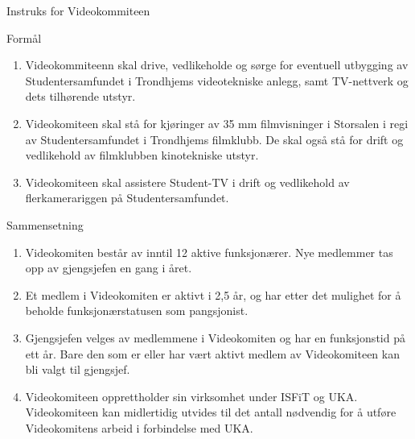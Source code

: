 
\begin{instruks}{Instruks for Videokommiteen}{ }{ }
    
    \begin{instruksledd}{Formål}
        \begin{enumerate}
            \item Videokommiteenn skal drive, vedlikeholde og sørge for eventuell
                utbygging av Studentersamfundet i
                Trondhjems videotekniske anlegg, samt TV-nettverk og dets tilhørende utstyr.
            \item Videokomiteen skal stå for kjøringer av 35 mm filmvisninger i
                Storsalen i regi av Studentersamfundet i
                Trondhjems filmklubb. De skal også stå for drift og vedlikehold av filmklubben
                kinotekniske utstyr.
            \item Videokomiteen skal assistere Student-TV i drift og vedlikehold av
                flerkamerariggen på Studentersamfundet.
        \end{enumerate}
    \end{instruksledd}

    \begin{instruksledd}{Sammensetning}
        \begin{enumerate}
            \item Videokomiten består av inntil 12 aktive funksjonærer. Nye medlemmer tas opp av
            gjengsjefen en gang i året.
            \item  Et medlem i Videokomiten er aktivt i 2,5 år, og har etter det mulighet for å
            beholde funksjonærstatusen som
            pangsjonist.
            \item Gjengsjefen velges av medlemmene i Videokomiten og har en funksjonstid på ett
            år. Bare den som er eller
            har vært aktivt medlem av Videokomiteen kan bli valgt til gjengsjef.
            \item Videokomiteen opprettholder sin virksomhet under ISFiT og UKA. Videokomiteen
            kan midlertidig utvides
            til det antall nødvendig for å utføre Videokomitens arbeid i forbindelse med UKA.
        \end{enumerate}
    \end{instruksledd}


\end{instruks}
